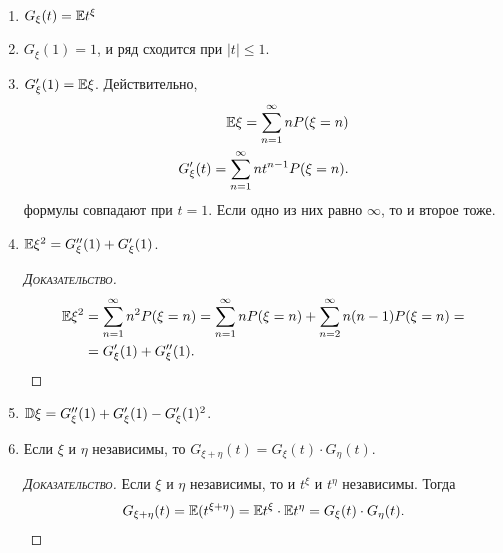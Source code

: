 \documentclass[../main.tex]{subfiles}
\begin{document}
\begin{prop}\
 \begin{enumerate}
  \item $G_\xi(t) = \mathbb E t^{\xi}$
  \item $ G_\xi(1) = 1 $, и ряд сходится при $ \left| t \right| \leqslant 1 $.
  \item $ G'_\xi(1) = \mathbb E \xi $. Действительно,
   \begin{align*}
    \mathbb E \xi = \sum_{n=1}^{\infty} n P(\xi = n) \\
    G'_\xi(t) = \sum_{n=1}^{\infty} nt^{n-1} P(\xi = n).
   \end{align*} формулы совпадают при $ t = 1 $. Если одно из них равно $ \infty $, то и второе тоже.
  \item $ \mathbb E\xi^{2} = G''_\xi(1) + G'_\xi(1) $.
   \begin{proof}[\normalfont\textsc{Доказательство}]
    \begin{align*}
     \mathbb E\xi^{2} &= \sum_{n=1}^{\infty} n^{2}P(\xi = n) = \sum_{n=1}^{\infty} nP(\xi=n) + \sum_{n=2}^{\infty} n(n-1)P(\xi = n) = \\
     &= G'_\xi(1) + G''_\xi(1).
    \end{align*}
   \end{proof}
  \item $ \mathbb D\xi = G''_\xi(1) + G'_\xi(1) - G'_\xi(1)^{2} $.
  \item Если $ \xi $ и $ \eta $ независимы, то $ G_{\xi + \eta}(t) = G_{\xi}(t) \cdot G_\eta(t) $.
   \begin{proof}[\normalfont\textsc{Доказательство}]
    Если $ \xi $ и $ \eta $ независимы, то и $ t^{\xi}  $ и $ t^{\eta} $ независимы. Тогда
    \begin{align*}
     G_{\xi+\eta}(t) = \mathbb E(t^{\xi+\eta}) = \mathbb E t^{\xi} \cdot \mathbb E t^{\eta} = G_\xi(t) \cdot G_\eta(t).
    \end{align*}
   \end{proof}
 \end{enumerate}
\end{prop}
\end{document}
